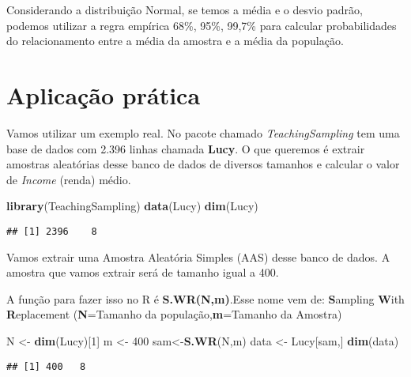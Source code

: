 \documentclass[]{book}
\newenvironment{Shaded}{\begin{snugshade}}{\end{snugshade}}
\newcommand{\KeywordTok}[1]{\textcolor[rgb]{0.13,0.29,0.53}{\textbf{#1}}}
\newcommand{\DecValTok}[1]{\textcolor[rgb]{0.00,0.00,0.81}{#1}}
\newcommand{\StringTok}[1]{\textcolor[rgb]{0.31,0.60,0.02}{#1}}
\newcommand{\OperatorTok}[1]{\textcolor[rgb]{0.81,0.36,0.00}{\textbf{#1}}}
\newcommand{\NormalTok}[1]{#1}
\theoremstyle{definition}
\theoremstyle{definition}
\theoremstyle{definition}
\theoremstyle{remark}
\begin{document}
Considerando a distribuição Normal, se temos a média e o desvio padrão,
podemos utilizar a regra empírica 68\%, 95\%, 99,7\% para calcular
probabilidades do relacionamento entre a média da amostra e a média da
população.

\section{Aplicação prática}\label{aplicacao-pratica}

Vamos utilizar um exemplo real. No pacote chamado
\emph{TeachingSampling} tem uma base de dados com 2.396 linhas chamada
\textbf{Lucy}. O que queremos é extrair amostras aleatórias desse banco
de dados de diversos tamanhos e calcular o valor de \emph{Income}
(renda) médio.

\begin{Shaded}
\begin{Highlighting}[]
\KeywordTok{library}\NormalTok{(TeachingSampling)}
\KeywordTok{data}\NormalTok{(Lucy)}
\KeywordTok{dim}\NormalTok{(Lucy)}
\end{Highlighting}
\end{Shaded}

\begin{verbatim}
## [1] 2396    8
\end{verbatim}

Vamos extrair uma Amostra Aleatória Simples (AAS) desse banco de dados.
A amostra que vamos extrair será de tamanho igual a 400.

A função para fazer isso no R é \textbf{S.WR(N,m)}.Esse nome vem de:
\textbf{S}ampling \textbf{W}ith \textbf{R}eplacement (\textbf{N}=Tamanho
da população,\textbf{m}=Tamanho da Amostra)

\begin{Shaded}
\begin{Highlighting}[]
\NormalTok{N <-}\StringTok{ }\KeywordTok{dim}\NormalTok{(Lucy)[}\DecValTok{1}\NormalTok{]}
\NormalTok{m <-}\StringTok{ }\DecValTok{400}
\NormalTok{sam<-}\KeywordTok{S.WR}\NormalTok{(N,m)}
\NormalTok{data <-}\StringTok{ }\NormalTok{Lucy[sam,]}
\KeywordTok{dim}\NormalTok{(data)}
\end{Highlighting}
\end{Shaded}

\begin{verbatim}
## [1] 400   8
\end{verbatim}

\begin{Shaded}
\end{Shaded}
\end{document}
